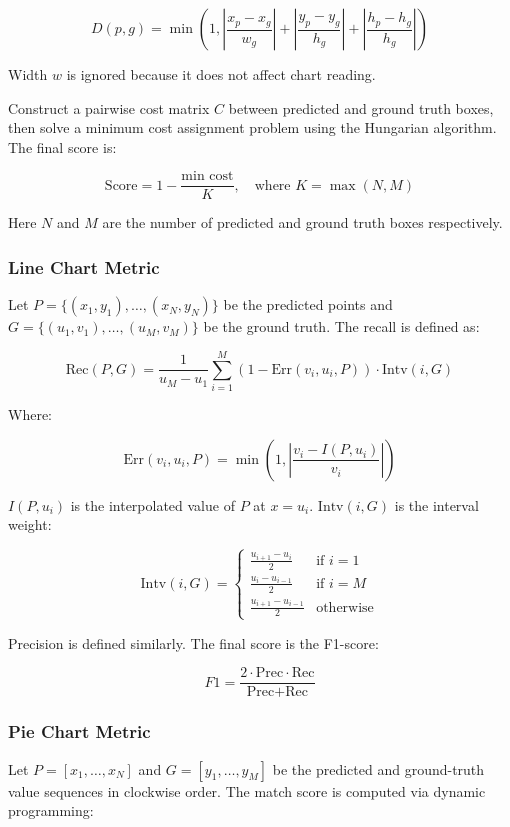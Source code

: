 \documentclass[
	letterpaper, %
]{jdf}
\begin{document}
\[
D(p, g) = \min\left(1, \left\lvert \frac{x_p - x_g}{w_g} \right\rvert + \left\lvert \frac{y_p - y_g}{h_g} \right\rvert + \left\lvert \frac{h_p - h_g}{h_g} \right\rvert\right)
\]

Width $w$ is ignored because it does not affect chart reading.

Construct a pairwise cost matrix $C$ between predicted and ground truth boxes, then solve a minimum cost assignment problem using the Hungarian algorithm. The final score is:

\[
\text{Score} = 1 - \frac{\text{min cost}}{K}, \quad \text{where } K = \max(N, M)
\]

Here $N$ and $M$ are the number of predicted and ground truth boxes respectively.

\subsubsection{Line Chart Metric}

Let $P = \{(x_1, y_1), \ldots, (x_N, y_N)\}$ be the predicted points and $G = \{(u_1, v_1), \ldots, (u_M, v_M)\}$ be the ground truth. The recall is defined as:

\[
\text{Rec}(P, G) = \frac{1}{u_M - u_1} \sum_{i=1}^{M} \left(1 - \text{Err}(v_i, u_i, P)\right) \cdot \text{Intv}(i, G)
\]

Where:

\[
\text{Err}(v_i, u_i, P) = \min\left(1, \left\lvert \frac{v_i - I(P, u_i)}{v_i} \right\rvert\right)
\]

$I(P, u_i)$ is the interpolated value of $P$ at $x = u_i$. $\text{Intv}(i, G)$ is the interval weight:

\[
\text{Intv}(i, G) =
\begin{cases}
\frac{u_{i+1} - u_i}{2} & \text{if } i = 1 \\
\frac{u_i - u_{i-1}}{2} & \text{if } i = M \\
\frac{u_{i+1} - u_{i-1}}{2} & \text{otherwise}
\end{cases}
\]

Precision is defined similarly. The final score is the F1-score:

\[
F1 = \frac{2 \cdot \text{Prec} \cdot \text{Rec}}{\text{Prec} + \text{Rec}}
\]

\subsubsection{Pie Chart Metric}

Let $P = [x_1, \dots, x_N]$ and $G = [y_1, \dots, y_M]$ be the predicted and ground-truth value sequences in clockwise order. The match score is computed via dynamic programming:
\end{document}
